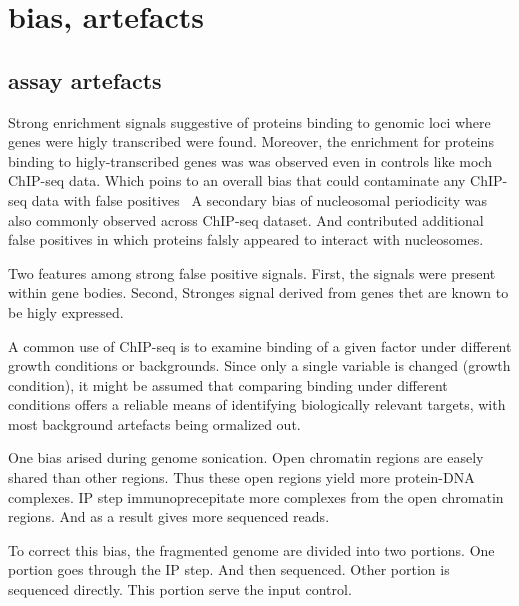 \chapter{bias, artefacts}


\section{assay artefacts}
Strong enrichment signals suggestive of proteins binding to genomic loci where genes were higly transcribed were found.
Moreover, the enrichment for proteins binding to higly-transcribed genes was was observed even in controls like moch ChIP-seq data.
Which poins to an overall bias that could contaminate any ChIP-seq data with false positives~\cite{park2013widespread}
A secondary bias of nucleosomal periodicity was also commonly observed across ChIP-seq dataset.
And contributed additional false positives in which proteins falsly appeared to interact with nucleosomes.

Two features among strong false positive signals.
First, the signals were present within gene bodies.
Second, Stronges signal derived from genes thet are known to be higly expressed.

A common use of ChIP-seq is to examine binding of a given factor under different growth conditions or backgrounds.
Since only a single variable is changed (growth condition), it might be assumed that comparing binding under different conditions offers a reliable means of identifying biologically relevant targets, with most background artefacts being ormalized out.

One bias arised during genome sonication.
Open chromatin regions are easely shared than other regions.
Thus these open regions yield more protein-DNA complexes.
IP step immunoprecepitate more complexes from the open chromatin regions.
And as a result gives more sequenced reads.

To correct this bias, the fragmented genome are divided into two portions.
One portion goes through the IP step.
And then sequenced.
Other portion is sequenced directly.
This portion serve the input control.

